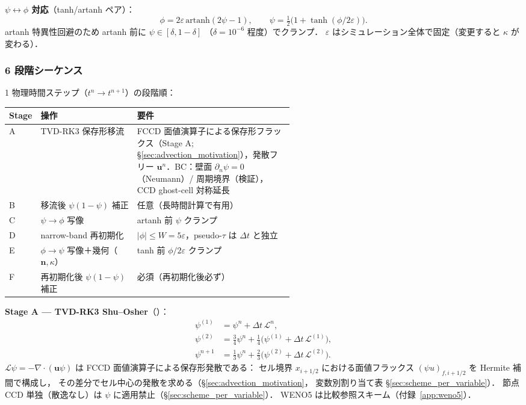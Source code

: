 \noindent\textbf{$\psi\leftrightarrow\phi$ 対応}（tanh/artanh ペア）：
\begin{equation}
  \phi = 2\varepsilon\,\mathrm{artanh}(2\psi-1),
  \qquad
  \psi = \tfrac{1}{2}\bigl(1 + \tanh(\phi/2\varepsilon)\bigr).
  \label{eq:cls_psi_phi_map}
\end{equation}
artanh 特異性回避のため artanh 前に $\psi\in[\delta,1-\delta]$
（$\delta=10^{-6}$ 程度）でクランプ．
$\varepsilon$ はシミュレーション全体で固定（変更すると $\kappa$ が変わる）．

\subsubsection{6 段階シーケンス}
\label{sec:cls_stage_sequence}

1 物理時間ステップ（$t^n\to t^{n+1}$）の段階順：

\begin{center}
\begin{tabular}{@{}llp{0.55\linewidth}@{}}
\hline
Stage & 操作 & 要件 \\
\hline
A & TVD-RK3 保存形移流 & FCCD 面値演算子による保存形フラックス（Stage A; \S\ref{sec:advection_motivation}），発散フリー $\mathbf{u}^n$．BC：壁面 $\partial_n\psi=0$（Neumann）/ 周期境界（検証），CCD ghost-cell 対称延長 \\
B & 移流後 $\psi(1-\psi)$ 補正 & 任意（長時間計算で有用）\\
C & $\psi\to\phi$ 写像 & artanh 前 $\psi$ クランプ \\
D & narrow-band 再初期化 & $|\phi|\le W=5\varepsilon$，pseudo-$\tau$ は $\Delta t$ と独立 \\
E & $\phi\to\psi$ 写像＋幾何（$\mathbf{n},\kappa$）& tanh 前 $\phi/2\varepsilon$ クランプ \\
F & 再初期化後 $\psi(1-\psi)$ 補正 & 必須（再初期化後必ず）\\
\hline
\end{tabular}
\end{center}

\noindent\textbf{Stage A — TVD-RK3 Shu--Osher}（\cite{ShuOsher1988}）：
\begin{align}
  \psi^{(1)} &= \psi^n + \Delta t\,\mathcal{L}^n, \label{eq:cls_rk3_1}\\
  \psi^{(2)} &= \tfrac{3}{4}\psi^n + \tfrac{1}{4}\bigl(\psi^{(1)} + \Delta t\,\mathcal{L}^{(1)}\bigr), \label{eq:cls_rk3_2}\\
  \psi^{n+1} &= \tfrac{1}{3}\psi^n + \tfrac{2}{3}\bigl(\psi^{(2)} + \Delta t\,\mathcal{L}^{(2)}\bigr). \label{eq:cls_rk3_3}
\end{align}
$\mathcal{L}\psi = -\nabla\cdot(\mathbf{u}\psi)$ は FCCD 面値演算子による保存形発散である：
セル境界 $x_{i+1/2}$ における面値フラックス $(\psi u)_{f,i+1/2}$ を Hermite 補間で構成し，
その差分でセル中心の発散を求める（\S\ref{sec:advection_motivation}，
変数別割り当て表 \S\ref{sec:scheme_per_variable}）．
節点 CCD 単独（散逸なし）は $\psi$ に適用禁止（\S\ref{sec:scheme_per_variable}）．
WENO5 は比較参照スキーム（付録~\ref{app:weno5}）．

